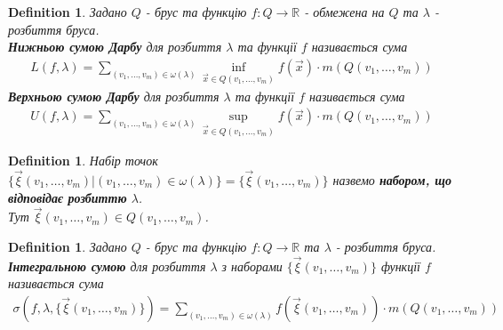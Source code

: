 \documentclass[a4paper, 10pt]{article}
\theoremstyle{theoremdd}
\theoremstyle{theoremdd}
\newtheorem{definition}[theorem]{Definition}
\theoremstyle{theoremdd}
\theoremstyle{theoremdd}
\theoremstyle{theoremdd}
\theoremstyle{theoremdd}
\theoremstyle{theoremdd}
\theoremstyle{theoremdd}
\begin{document}
\begin{definition}
Задано $Q$ - брус та функцію $f: Q \to \mathbb{R}$ - обмежена на $Q$ та $\lambda$ - розбиття бруса.\\
\textbf{Нижньою сумою Дарбу} для розбиття $\lambda$ та функції $f$ називається сума
\begin{align*}
L(f,\lambda) = \sum_{(v_1,\dots,v_m) \in \omega(\lambda)} \inf_{\vec{x} \in Q(v_1,\dots,v_m)} f(\vec{x}) \cdot m(Q(v_1,\dots,v_m))
\end{align*}
\textbf{Верхньою сумою Дарбу} для розбиття $\lambda$ та функції $f$ називається сума
\begin{align*}
U(f,\lambda) = \sum_{(v_1,\dots,v_m) \in \omega(\lambda)} \sup_{\vec{x} \in Q(v_1,\dots,v_m)} f(\vec{x}) \cdot m(Q(v_1,\dots,v_m))
\end{align*}
\end{definition}

\begin{definition}
Набір точок $\{ \vec{\xi}(v_1,\dots,v_m) | (v_1,\dots,v_m) \in \omega(\lambda) \} = \{ \vec{\xi} (v_1,\dots,v_m) \}$ назвемо \textbf{набором, що відповідає розбиттю} $\lambda$.\\
Тут $\vec{\xi}(v_1,\dots,v_m) \in Q(v_1,\dots,v_m)$.
\end{definition}

\begin{definition}
Задано $Q$ - брус та функцію $f: Q \to \mathbb{R}$ та $\lambda$ - розбиття бруса.\\
\textbf{Інтегральною сумою} для розбиття $\lambda$ з наборами $\{ \vec{\xi}(v_1,\dots,v_m) \}$ функції $f$ називається сума
\begin{align*}
\sigma(f,\lambda, \{ \vec{\xi}(v_1,\dots,v_m) \}) = \sum_{(v_1,\dots,v_m) \in \omega(\lambda)} f(\vec{\xi}(v_1,\dots,v_m)) \cdot m(Q(v_1,\dots,v_m))
\end{align*}
\end{definition}

\end{document}
